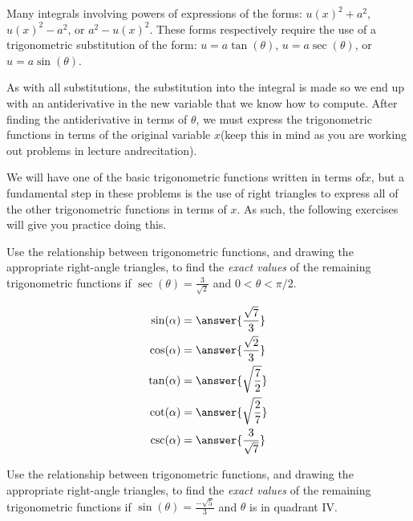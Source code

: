 \documentclass{ximera}
\author{}
\begin{document}
\begin{exercise}

  Many integrals involving powers of expressions of the​ forms: $u(x)^2 + a^2$, $u(x)^2 - a^2$, or $a^2 - u(x)^2$.
  These forms respectively require the use of a trigonometric substitution of the​ form: $u = a \tan(\theta)$, $u = a \sec(\theta)$, or $u = a \sin(\theta)$.
 
  As with all​ substitutions, the substitution into the integral is made so we end up with an antiderivative in the new variable that we know how to compute.
  After finding the antiderivative in terms of $\theta$​, we must express the trigonometric functions in terms of the original variable $x$​ (keep this in mind as you are working out problems in lecture and​ recitation). 
  
  We will have one of the basic trigonometric functions written in terms of​ $x$, but a fundamental step in these problems is the use of right triangles to express all of the other trigonometric functions in terms of $x$.
  As​ such, the following exercises will give you practice doing this.
  
  \begin{multipleChoice}
  \end{multipleChoice}  

\begin{problem}
  Use the relationship between trigonometric functions, and drawing the appropriate right-angle triangles, to find the \emph{exact values} of the remaining trigonometric functions if $\sec(\theta) = \frac{3}{\sqrt{2}}$ and $0 < \theta < \pi/2$.
  
    \begin{align*}
      \sin(\alpha) &= \answer{\frac{\sqrt{7}}{3}}  \\
      \cos(\alpha) &= \answer{\frac{\sqrt{2}}{3}}  \\
      \tan(\alpha) &= \answer{\sqrt{\frac{7}{2}}}  \\
      \cot(\alpha) &= \answer{\sqrt{\frac{2}{7}}}  \\
      \csc(\alpha) &= \answer{\frac{3}{\sqrt{7}}}
    \end{align*}  
\end{problem}

\begin{problem}
   Use the relationship between trigonometric functions, and drawing the appropriate right-angle triangles, to find the \emph{exact values} of the remaining trigonometric functions if $\sin(\theta) = \frac{-\sqrt{5}}{3}$ and $\theta$ is in quadrant IV.
  

\end{problem}
\end{exercise}
\end{document}
